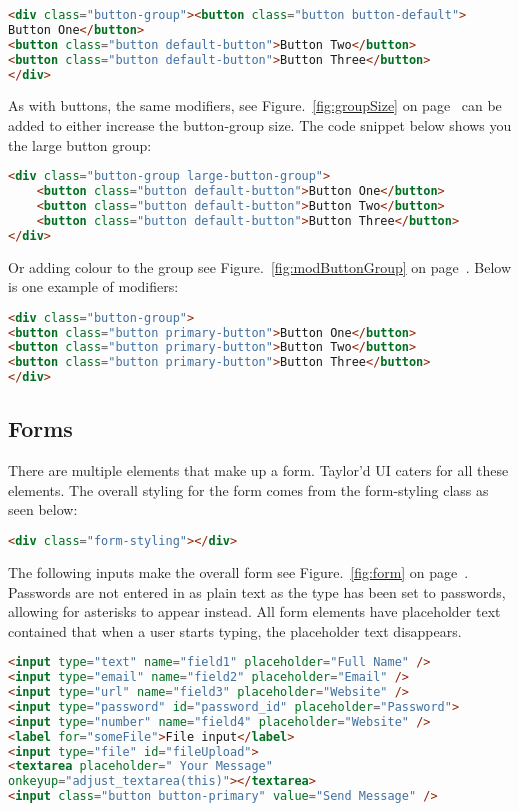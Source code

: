 \begin{lstlisting}[language=HTML]
<div class="button-group"><button class="button button-default">
Button One</button>
<button class="button default-button">Button Two</button>
<button class="button default-button">Button Three</button>
</div>
\end{lstlisting}

As with buttons, the same modifiers, see Figure.~\ref{fig:groupSize} on  page~\pageref{fig:groupSize} can be added to either increase the button-group size. The code snippet below shows you the large button group:

\begin{lstlisting}[language=HTML]
<div class="button-group large-button-group">
	<button class="button default-button">Button One</button>
	<button class="button default-button">Button Two</button>
	<button class="button default-button">Button Three</button>
</div>
\end{lstlisting}

Or adding colour to the group see Figure.~\ref{fig:modButtonGroup} on  page~\pageref{fig:modButtonGroup}. Below is one example of modifiers:  

\begin{lstlisting}[language=HTML]
<div class="button-group">
<button class="button primary-button">Button One</button>
<button class="button primary-button">Button Two</button>
<button class="button primary-button">Button Three</button>
</div>
\end{lstlisting}

\subsection*{Forms}
There are multiple elements that make up a form. Taylor'd UI caters for all these elements. The overall styling for the form comes from the form-styling class as seen below:
\begin{lstlisting}[language=HTML]
<div class="form-styling"></div>
\end{lstlisting}

The following inputs make the overall form see Figure.~\ref{fig:form} on  page~\pageref{fig:form}. Passwords are not entered in as plain text as the type has been set to passwords, allowing for asterisks to appear instead. All form elements have placeholder text contained that when a user starts typing, the placeholder text disappears.

\begin{lstlisting}[language=HTML]
<input type="text" name="field1" placeholder="Full Name" />
<input type="email" name="field2" placeholder="Email" />
<input type="url" name="field3" placeholder="Website" />
<input type="password" id="password_id" placeholder="Password">
<input type="number" name="field4" placeholder="Website" />
<label for="someFile">File input</label>
<input type="file" id="fileUpload">
<textarea placeholder=" Your Message" 
onkeyup="adjust_textarea(this)"></textarea>
<input class="button button-primary" value="Send Message" />
\end{lstlisting}


